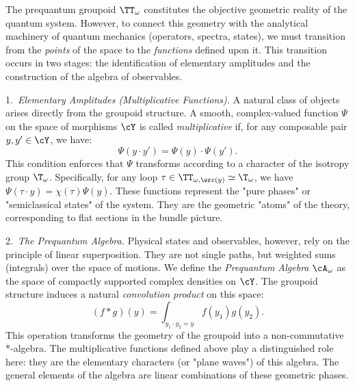  \begin{article}
    \label{art:From Geometry to Algebra}
    
    The prequantum groupoid $\TT_\omega$ constitutes the objective geometric reality of the quantum system.
    However,
    to connect this geometry with the analytical machinery of quantum mechanics (operators,
    spectra,
    states),
    we must transition from the \emph{points} of the space to the \emph{functions} defined upon it.
    This transition occurs in two stages:
    the identification of elementary amplitudes and the construction of the algebra of observables.
    
    1.~\emph{Elementary Amplitudes (Multiplicative Functions).}
    A natural class of objects arises directly from the groupoid structure.
    A smooth,
    complex-valued function $\Psi$ on the space of morphisms $\cY$ is called \emph{multiplicative} if,
    for any composable pair $y, y' \in \cY$,
    we have:
    $$
      \Psi(y \cdot y') = \Psi(y) \cdot \Psi(y').
      $$
    This condition enforces that $\Psi$ transforms according to a character of the isotropy group $\T_\omega$.
    Specifically,
    for any loop $\tau \in \TT_{\omega, \src(y)} \simeq \T_\omega$,
    we have $\Psi(\tau \cdot y) = \chi(\tau)\Psi(y)$.
    These functions represent the "pure phases" or "semiclassical states" of the system.
    They are the geometric "atoms" of the theory,
    corresponding to flat sections in the bundle picture.
    
    2.~\emph{The Prequantum Algebra.}
    Physical states and observables,
    however,
    rely on the principle of linear superposition.
    They are not single paths,
    but weighted sums (integrals) over the space of motions.
    We define the \emph{Prequantum Algebra} $\cA_\omega$ as the space of compactly supported complex densities on $\cY$.
    The groupoid structure induces a natural \emph{convolution product} on this space:
    $$
      (f * g)(y) = \int_{y_1 \cdot y_2 = y} f(y_1) g(y_2).
      $$
    This operation transforms the geometry of the groupoid into a non-commutative $*$-algebra.
    The multiplicative functions defined above play a distinguished role here:
    they are the elementary characters (or "plane waves") of this algebra.
    The general elements of the algebra are linear combinations of these geometric phases.
    

\end{article}
